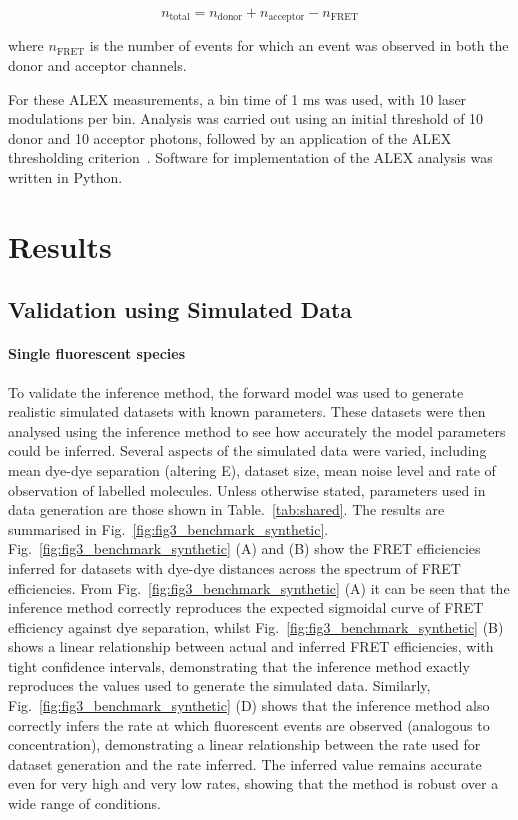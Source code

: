 \begin{equation}
n_{\text{total}} = n_{\text{donor}} + n_{\text{acceptor}} - n_{\text{FRET}}
\label{eq:total_events}
\end{equation}

where $n_{\text{FRET}}$ is the number of events for which an event was observed in both the donor and acceptor channels. 

For these ALEX measurements, a bin time of 1 ms was used, with 10 laser modulations per bin. Analysis was carried out using an initial threshold of 10 donor and 10 acceptor photons, followed by an application of the ALEX thresholding criterion~\cite{kapanidis05}. Software for implementation of the ALEX analysis was written in Python.


\section{Results}
\subsection{Validation using Simulated Data}
\paragraph*{Single fluorescent species}


To validate the inference method, the forward model was used to generate realistic simulated datasets with known parameters. These datasets were then analysed using the inference method to see how accurately the model parameters could be inferred. Several aspects of the simulated data were varied, including mean dye-dye separation (altering E), dataset size, mean noise level and rate of observation of labelled molecules.  Unless otherwise stated, parameters used in data generation are those shown in Table.~\ref{tab:shared}. The results are summarised in Fig.~\ref{fig:fig3_benchmark_synthetic}.  Fig.~\ref{fig:fig3_benchmark_synthetic} (A) and (B) show the FRET efficiencies inferred for datasets with dye-dye distances across the spectrum of FRET efficiencies.  From Fig.~\ref{fig:fig3_benchmark_synthetic} (A) it can be seen that the inference method correctly reproduces the expected sigmoidal curve of FRET efficiency against dye separation, whilst Fig.~\ref{fig:fig3_benchmark_synthetic} (B) shows a linear relationship between actual and inferred FRET efficiencies, with tight confidence intervals, demonstrating that the inference method exactly reproduces the values used to generate the simulated data.  Similarly, Fig.~\ref{fig:fig3_benchmark_synthetic} (D) shows that the inference method also correctly infers the rate at which fluorescent events are observed (analogous to concentration), demonstrating a linear relationship between the rate used for dataset generation and the rate inferred.  The inferred value remains accurate even for very high and very low rates, showing that the method is robust over a wide range of conditions. 

